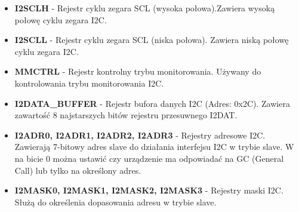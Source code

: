 \begin{itemize}
    
    
    \item \textbf{I2SCLH} - Rejestr cyklu zegara SCL (wysoka połowa).Zawiera wysoką połowę cyklu zegara I2C.
    \item \textbf{I2SCLL} - Rejestr cyklu zegara SCL (niska połowa). Zawiera niską połowę cyklu zegara I2C.
    \item \textbf{MMCTRL} - Rejestr kontrolny trybu monitorowania. Używany do kontrolowania trybu monitorowania I2C.
    \item \textbf{I2DATA\_BUFFER} - Rejestr bufora danych I2C (Adres: 0x2C). Zawiera zawartość 8 najstarszych bitów rejestru przesuwnego I2DAT.
    
    \item \textbf{I2ADR0, I2ADR1, I2ADR2, I2ADR3} - Rejestry adresowe I2C. Zawierają 7-bitowy adres slave do działania interfejsu I2C w trybie slave. W na bicie 0 można ustawić czy urządzenie ma odpowiadać na GC (General Call) lub tylko na określony adres.
    \item \textbf{I2MASK0, I2MASK1, I2MASK2, I2MASK3} - Rejestry maski I2C. Służą do określenia dopasowania adresu w trybie slave.
\end{itemize}

